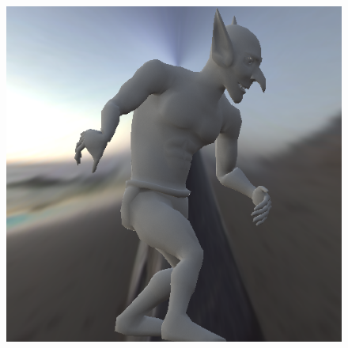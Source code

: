 \begin{figure}[H]
\endminipage\hfill
{}%
  \includegraphics[width=\linewidth]{./Imagens/brdfs/oren-nayar-goblin.png}
\endminipage
\end{figure}

